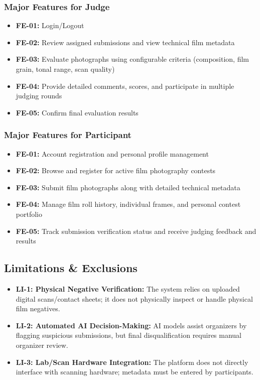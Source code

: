 \subsubsection{Major Features for Judge}
\begin{itemize}
    \item \textbf{FE-01:} Login/Logout
    \item \textbf{FE-02:} Review assigned submissions and view technical film metadata
    \item \textbf{FE-03:} Evaluate photographs using configurable criteria (composition, film grain, tonal range, scan quality)
    \item \textbf{FE-04:} Provide detailed comments, scores, and participate in multiple judging rounds
    \item \textbf{FE-05:} Confirm final evaluation results
\end{itemize}

\subsubsection{Major Features for Participant}
\begin{itemize}
    \item \textbf{FE-01:} Account registration and personal profile management
    \item \textbf{FE-02:} Browse and register for active film photography contests
    \item \textbf{FE-03:} Submit film photographs along with detailed technical metadata
    \item \textbf{FE-04:} Manage film roll history, individual frames, and personal contest portfolio
    \item \textbf{FE-05:} Track submission verification status and receive judging feedback and results
\end{itemize}

\subsection{Limitations \& Exclusions}
\begin{itemize}
    \item \textbf{LI-1: Physical Negative Verification:} The system relies on uploaded digital scans/contact sheets; it does not physically inspect or handle physical film negatives.
    \item \textbf{LI-2: Automated AI Decision-Making:} AI models assist organizers by flagging suspicious submissions, but final disqualification requires manual organizer review.
    \item \textbf{LI-3: Lab/Scan Hardware Integration:} The platform does not directly interface with scanning hardware; metadata must be entered by participants.
\end{itemize}
